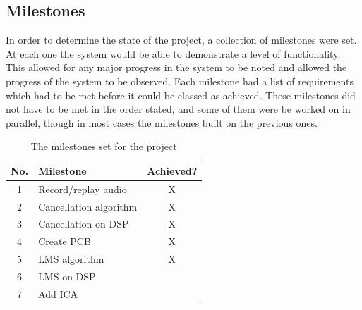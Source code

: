 \subsection{Milestones}
In order to determine the state of the project, a collection of milestones were set.
At each one the system would be able to demonstrate a level of functionality.
This allowed for any major progress in the system to be noted and allowed the progress of the system to be observed.
Each milestone had a list of requirements which had to be met before it could be classed as achieved.
These milestones did not have to be met in the order stated, and some of them were be worked on in parallel, though in most cases the milestones built on the previous ones.

\begin{table}[H]
	\centering
	\begin{tabular}[c]{| c | l | c |}
		\hline
		No.	& Milestone		& Achieved? \\
		\hline
		1	& Record/replay audio	& X \\
		2	& Cancellation algorithm & X \\
		3	& Cancellation on DSP	& X \\
		4	& Create PCB		& X \\
		5	& LMS algorithm		& X \\
		6	& LMS on DSP		& \\
		7	& Add ICA		& \\
		\hline
	\end{tabular}
	\caption{The milestones set for the project}
	\label{tab:milestones}
\end{table}
